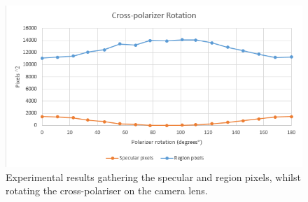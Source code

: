 \documentclass[fleqn,twoside,12pt]{report}
\begin{document}
\begin{figure}[h]
	\centering
	\includegraphics[width=.7\linewidth]{polarizer_rot.png}
	\caption{Experimental results gathering the specular and region pixels, whilst rotating the cross-polariser on the camera lens.}
	\label{fig:graph_polar}
\end{figure}
\end{document}
